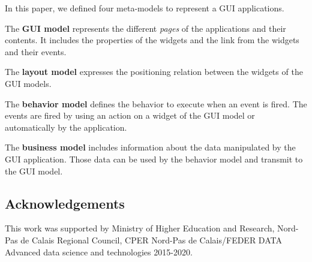 \documentclass[conference]{IEEEtran}
\begin{document}

In this paper, we defined four meta-models to represent a GUI applications.

The \textbf{GUI model} represents the different \textit{pages} of the applications and their contents.
It includes the properties of the widgets and the link from the widgets and their events.

The \textbf{layout model} expresses the positioning relation between the widgets of the GUI models.

The \textbf{behavior model} defines the behavior to execute when
    an event is fired.
The events are fired by using an action on a widget of the GUI model or
    automatically by the application.

The \textbf{business model} includes information about the data manipulated
    by the GUI application.
Those data can be used by the behavior model and transmit to the
    GUI model.

\subsection*{Acknowledgements} 
This work was supported by Ministry of Higher Education and Research, Nord-Pas de Calais Regional Council, CPER Nord-Pas de Calais/FEDER DATA Advanced data science and technologies 2015-2020.

%


\end{document}
